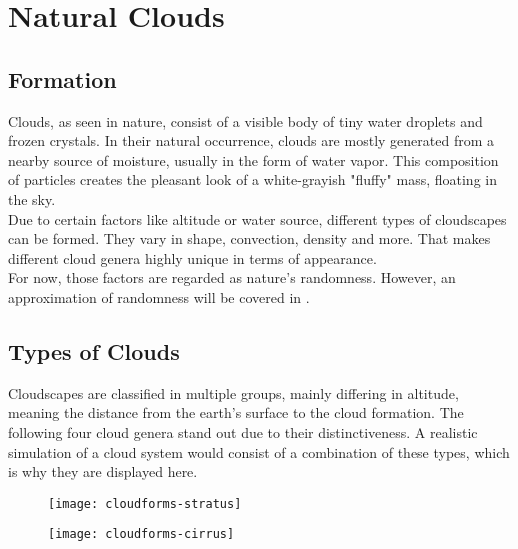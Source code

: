 \section{Natural Clouds}

\subsection{Formation}
Clouds, as seen in nature, consist of a visible body of tiny water droplets and frozen crystals. 
In their natural occurrence, clouds are mostly generated from a nearby source of moisture, usually in the form of water vapor. 
This composition of particles creates the pleasant look of a white-grayish "fluffy" mass, floating in the sky.
\\
Due to certain factors like altitude or water source, different types of cloudscapes can be formed. They vary in shape, \gls{convection}, density and more.
That makes different cloud genera highly unique in terms of appearance.
\\
For now, those factors are regarded as nature's randomness. However, an approximation of randomness will be covered in .


\subsection{Types of Clouds}
\label{section:cloud-types}
Cloudscapes are classified in multiple groups, mainly differing in altitude, meaning the distance from the earth's surface to the cloud formation.
The following four cloud genera stand out due to their distinctiveness. A realistic simulation of a cloud system would consist of a combination of these types, which is why they are displayed here.
\begin{figure}[ht]
    \centering
        \begin{minipage}{0.47\linewidth}
            \texttt{[image: cloudforms-stratus]}
            \label{img:photo:cloudforms-stratus}        
        \end{minipage}        
    \hfill
        \begin{minipage}{0.47\linewidth}
            \texttt{[image: cloudforms-cirrus]}
            \label{img:photo:cloudforms-cirrus}        
        \end{minipage}
\end{figure}


